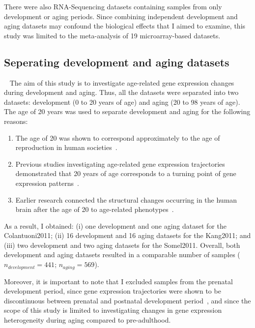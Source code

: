 There were also RNA-Sequencing datasets containing samples from only development or aging periods. 
Since combining independent development and aging datasets may confound the biological effects that I aimed to examine, 
this study was limited to the meta-analysis of 19 microarray-based datasets. 

\subsection{Seperating development and aging datasets}~\label{subsec:dset.seperation}
The aim of this study is to investigate age-related gene expression changes during development and aging. 
Thus, all the datasets were separated into two datasets: development (0 to 20 years of age) and aging (20 to 98 years of age).
The age of 20 years was used to separate development and aging for the following reasons:
\begin{enumerate}
    \item The age of 20 was shown to correspond approximately to the age of reproduction in human societies~\autocite{Walker2006}.
    \item Previous studies investigating age-related gene expression trajectories demonstrated that 20 years of age corresponds to a turning point of gene expression patterns~\autocite{Colantuoni2011, Donertas2017, Somel2010}.
    \item Earlier research connected the structural changes occurring in the human brain after the age of 20 to age-related phenotypes~\autocite{Sowell2004}.
\end{enumerate}

As a result, I obtained: 
(i) one development and one aging dataset for the Colantuoni2011; 
(ii) 16 development and 16 aging datasets for the Kang2011; and
(iii) two development and two aging datasets for the Somel2011.
Overall, both development and aging datasets resulted in a comparable number of samples ($n_{development} = 441$; $n_{aging}=569$).

Moreover, it is important to note that I excluded samples from the prenatal development period, 
since gene expression trajectories were shown to be discontinuous between prenatal and postnatal development period~\autocite{Colantuoni2011, Kang2011}, 
and since the scope of this study is limited to investigating changes in gene expression heterogeneity during aging compared to pre-adulthood.

